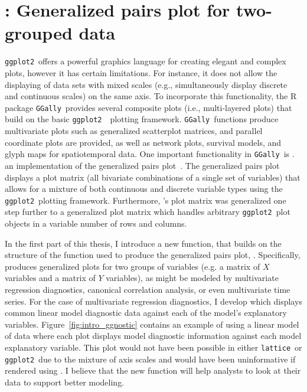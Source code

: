 \documentclass[stat,dissertation]{puthesis}\usepackage[]{graphicx}\usepackage{xcolor}
\newcommand{\pkg}[1]{\texttt{#1}}
\newcommand{\ggplot}{\pkg{ggplot2}}
\newcommand{\GGally}{\pkg{GGally}}
\begin{document}
\section{: Generalized pairs plot for two-grouped data}



\ggplot~offers a powerful graphics language for creating elegant and complex plots, however it has certain limitations. For instance, it does not allow the displaying of data sets with mixed scales (e.g., simultaneously display discrete and continuous scales) on the same axis.
To incorporate this functionality, the R package \GGally~provides several composite plots (i.e., multi-layered plots) that build on the basic \ggplot~\cite{r_ggplot2}~plotting framework. %
\GGally~functions produce multivariate plots such as generalized scatterplot matrices, and parallel coordinate plots are provided, as well as network plots, survival models, and glyph maps for spatiotemporal data.
One important functionality in \GGally~is .  an implementation of the generalized pairs plot~\cite{emerson2013gpp}.  The generalized pairs plot displays a plot matrix (all bivariate combinations of a single set of variables) that allows for a mixture of both continuous and discrete variable types using the \ggplot~plotting framework. Furthermore, 's plot matrix was generalized one step further to a generalized plot matrix which handles arbitrary \ggplot~plot objects in a variable number of rows and columns.

In the first part of this thesis, I introduce a new function,  that builds on the structure of the  function used to produce the generalized pairs plot, .
Specifically,  produces generalized plots for two groups of variables (e.g. a matrix of $X$ variables and a matrix of $Y$ variables), as might be modeled by multivariate regression diagnostics, canonical correlation analysis, or even multivariate time series.  For the case of multivariate regression diagnostics, I develop  which displays common linear model diagnostic data against each of the model's explanatory variables. Figure~\ref{fig:intro_ggnostic} contains an example of  using a linear model of  data where each plot displays model diagnostic information against each model explanatory variable.  This plot would not have been possible in either \pkg{lattice}~or \ggplot~due to the mixture of axis scales and would have been uninformative if rendered using . I believe that the new function  will help analysts to look at their data to support better modeling.
\end{document}
